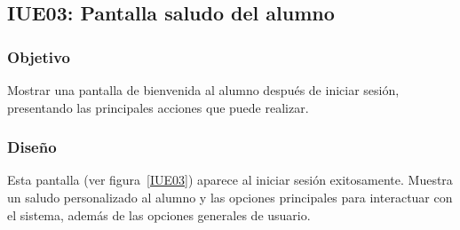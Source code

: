 \subsection{IUE03: Pantalla saludo del alumno}

\label{IUE03}
\newpage

\subsubsection{Objetivo}
Mostrar una pantalla de bienvenida al alumno después de iniciar sesión, presentando las principales acciones que puede realizar.

\subsubsection{Diseño}
Esta pantalla  (ver figura~\ref{IUE03}) aparece al iniciar sesión exitosamente. Muestra un saludo personalizado al alumno y las opciones principales para interactuar con el sistema, además de las opciones generales de usuario.

